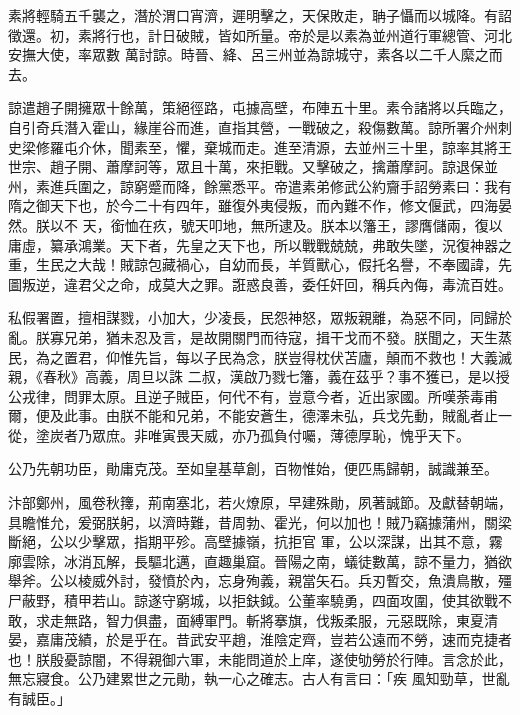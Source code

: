 \begin{pinyinscope}
 素將輕騎五千襲之，潛於渭口宵濟，遲明擊之，天保敗走，聃子懾而以城降。有詔徵還。初，素將行也，計日破賊，皆如所量。帝於是以素為並州道行軍總管、河北安撫大使，率眾數
 萬討諒。時晉、絳、呂三州並為諒城守，素各以二千人縻之而去。



 諒遣趙子開擁眾十餘萬，策絕徑路，屯據高壁，布陣五十里。素令諸將以兵臨之，自引奇兵潛入霍山，緣崖谷而進，直指其營，一戰破之，殺傷數萬。諒所署介州刺史梁修羅屯介休，聞素至，懼，棄城而走。進至清源，去並州三十里，諒率其將王世宗、趙子開、蕭摩訶等，眾且十萬，來拒戰。又擊破之，擒蕭摩訶。諒退保並州，素進兵圍之，諒窮蹙而降，餘黨悉平。帝遣素弟修武公約齎手詔勞素曰：我有隋之御天下也，於今二十有四年，雖復外夷侵叛，而內難不作，修文偃武，四海晏然。朕以不
 天，銜恤在疚，號天叩地，無所逮及。朕本以籓王，謬膺儲兩，復以庸虛，纂承鴻業。天下者，先皇之天下也，所以戰戰兢兢，弗敢失墜，況復神器之重，生民之大哉！賊諒包藏禍心，自幼而長，羊質獸心，假托名譽，不奉國諱，先圖叛逆，違君父之命，成莫大之罪。誑惑良善，委任奸回，稱兵內侮，毒流百姓。



 私假署置，擅相謀戮，小加大，少凌長，民怨神怒，眾叛親離，為惡不同，同歸於亂。朕寡兄弟，猶未忍及言，是故開關門而待寇，揖干戈而不發。朕聞之，天生蒸民，為之置君，仰惟先旨，每以子民為念，朕豈得枕伏苫廬，顛而不救也！大義滅親，《春秋》高義，周旦以誅
 二叔，漢啟乃戮七籓，義在茲乎？事不獲已，是以授公戎律，問罪太原。且逆子賊臣，何代不有，豈意今者，近出家國。所嘆荼毒甫爾，便及此事。由朕不能和兄弟，不能安蒼生，德澤未弘，兵戈先動，賊亂者止一從，塗炭者乃眾庶。非唯寅畏天威，亦乃孤負付囑，薄德厚恥，愧乎天下。



 公乃先朝功臣，勛庸克茂。至如皇基草創，百物惟始，便匹馬歸朝，誠識兼至。



 汴部鄭州，風卷秋籜，荊南塞北，若火燎原，早建殊勛，夙著誠節。及獻替朝端，具瞻惟允，爰弼朕躬，以濟時難，昔周勃、霍光，何以加也！賊乃竊據蒲州，關梁斷絕，公以少擊眾，指期平殄。高壁據嶺，抗拒官
 軍，公以深謀，出其不意，霧廓雲除，冰消瓦解，長驅北邁，直趣巢窟。晉陽之南，蟻徒數萬，諒不量力，猶欲舉斧。公以棱威外討，發憤於內，忘身殉義，親當矢石。兵刃暫交，魚潰鳥散，殭尸蔽野，積甲若山。諒遂守窮城，以拒鈇鉞。公董率驍勇，四面攻圍，使其欲戰不敢，求走無路，智力俱盡，面縛軍門。斬將搴旗，伐叛柔服，元惡既除，東夏清晏，嘉庸茂績，於是乎在。昔武安平趙，淮陰定齊，豈若公遠而不勞，速而克捷者也！朕殷憂諒闇，不得親御六軍，未能問道於上庠，遂使劬勞於行陣。言念於此，無忘寢食。公乃建累世之元勛，執一心之確志。古人有言曰：「疾
 風知勁草，世亂有誠臣。」




\end{pinyinscope}
